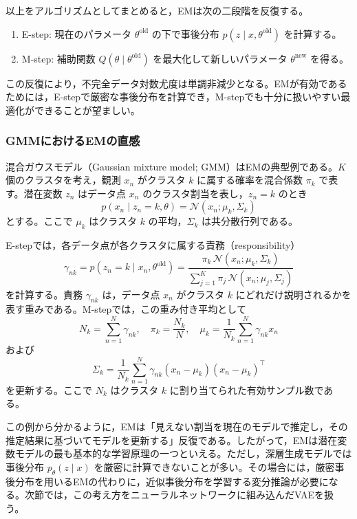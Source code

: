 以上をアルゴリズムとしてまとめると，EMは次の二段階を反復する。
\begin{enumerate}
\item E-step: 現在のパラメータ \(\theta^{\text{old}}\) の下で事後分布 \(p(z \mid x,\theta^{\text{old}})\) を計算する。
\item M-step: 補助関数 \(Q(\theta \mid \theta^{\text{old}})\) を最大化して新しいパラメータ \(\theta^{\text{new}}\) を得る。
\end{enumerate}
この反復により，不完全データ対数尤度は単調非減少となる。EMが有効であるためには，E-stepで厳密な事後分布を計算でき，M-stepでも十分に扱いやすい最適化ができることが望ましい。

\subsubsection{GMMにおけるEMの直感}

混合ガウスモデル（Gaussian mixture model; GMM）はEMの典型例である。\(K\) 個のクラスタを考え，観測 \(x_n\) がクラスタ \(k\) に属する確率を混合係数 \(\pi_k\) で表す。潜在変数 \(z_n\) はデータ点 \(x_n\) のクラスタ割当を表し，\(z_n=k\) のとき
\begin{equation}
p(x_n \mid z_n=k,\theta)=\mathcal{N}(x_n;\mu_k,\Sigma_k)
\end{equation}
とする。ここで \(\mu_k\) はクラスタ \(k\) の平均，\(\Sigma_k\) は共分散行列である。

E-stepでは，各データ点が各クラスタに属する責務（responsibility）
\begin{equation}
\gamma_{nk}
=
p(z_n=k \mid x_n,\theta^{\text{old}})
=
\frac{\pi_k\,\mathcal{N}(x_n;\mu_k,\Sigma_k)}
{\sum_{j=1}^{K}\pi_j\,\mathcal{N}(x_n;\mu_j,\Sigma_j)}
\end{equation}
を計算する。責務 \(\gamma_{nk}\) は，データ点 \(x_n\) がクラスタ \(k\) にどれだけ説明されるかを表す重みである。M-stepでは，この重み付き平均として
\begin{equation}
N_k=\sum_{n=1}^{N}\gamma_{nk},\quad
\pi_k=\frac{N_k}{N},\quad
\mu_k=\frac{1}{N_k}\sum_{n=1}^{N}\gamma_{nk}x_n
\end{equation}
および
\begin{equation}
\Sigma_k
=
\frac{1}{N_k}\sum_{n=1}^{N}\gamma_{nk}(x_n-\mu_k)(x_n-\mu_k)^{\top}
\end{equation}
を更新する。ここで \(N_k\) はクラスタ \(k\) に割り当てられた有効サンプル数である。

この例から分かるように，EMは「見えない割当を現在のモデルで推定し，その推定結果に基づいてモデルを更新する」反復である。したがって，EMは潜在変数モデルの最も基本的な学習原理の一つといえる。ただし，深層生成モデルでは事後分布 \(p_{\theta}(z \mid x)\) を厳密に計算できないことが多い。その場合には，厳密事後分布を用いるEMの代わりに，近似事後分布を学習する変分推論が必要になる。次節では，この考え方をニューラルネットワークに組み込んだVAEを扱う。

